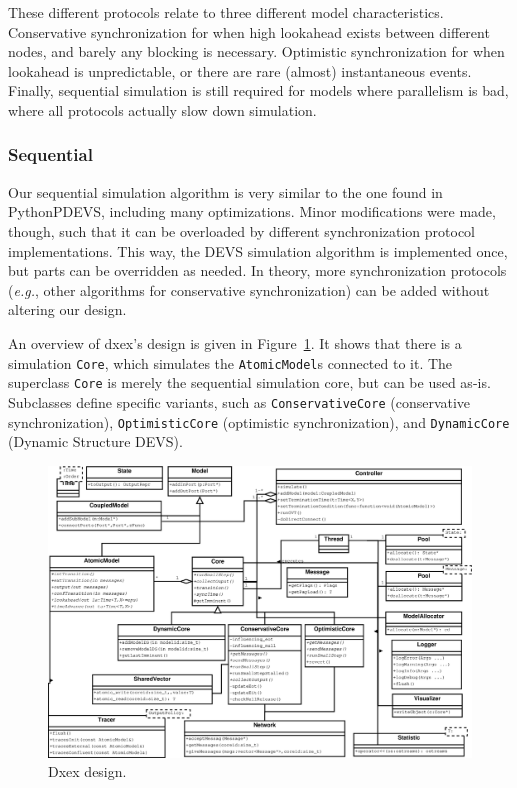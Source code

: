 These different protocols relate to three different model characteristics.
Conservative synchronization for when high lookahead exists between different nodes, and barely any blocking is necessary.
Optimistic synchronization for when lookahead is unpredictable, or there are rare (almost) instantaneous events.
Finally, sequential simulation is still required for models where parallelism is bad, where all protocols actually slow down simulation.

\subsubsection{Sequential}
Our sequential simulation algorithm is very similar to the one found in PythonPDEVS, including many optimizations.
Minor modifications were made, though, such that it can be overloaded by different synchronization protocol implementations.
This way, the \textsf{DEVS} simulation algorithm is implemented once, but parts can be overridden as needed.
In theory, more synchronization protocols (\textit{e.g.}, other algorithms for conservative synchronization) can be added without altering our design.

An overview of dxex's design is given in Figure~\ref{fig:class_diagram}.
It shows that there is a simulation \texttt{Core}, which simulates the \texttt{AtomicModel}s connected to it.
The superclass \texttt{Core} is merely the sequential simulation core, but can be used as-is.
Subclasses define specific variants, such as \texttt{ConservativeCore} (conservative synchronization), \texttt{OptimisticCore} (optimistic synchronization), and \texttt{DynamicCore} (\textsf{Dynamic Structure DEVS}).

\begin{figure}
    \includegraphics[width=\textwidth]{fig/cores_class_diagram.eps}
	\caption{Dxex design.}
	\label{fig:class_diagram}
\end{figure}

